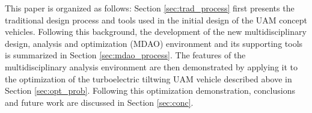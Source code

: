 This paper is organized as follows:
Section \ref{sec:trad_process} first presents the traditional design process and tools used in the initial design of the UAM concept vehicles.
Following this background, the development of the new multidisciplinary design, analysis and optimization (MDAO) environment and its supporting tools is summarized in Section \ref{sec:mdao_process}.
The features of the multidisciplinary analysis environment are then demonstrated by applying it to the optimization of the turboelectric tiltwing UAM vehicle described above in Section \ref{sec:opt_prob}.
Following this optimization demonstration, conclusions and future work are discussed in Section \ref{sec:conc}. 

